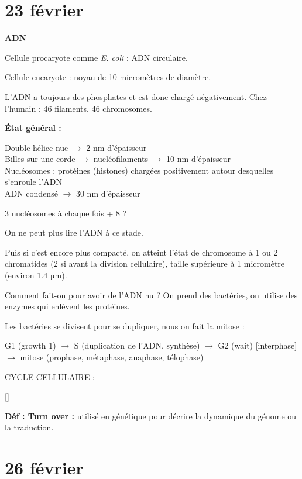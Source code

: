 \documentclass[11pt]{article}
\begin{document}
\section*{23 février}

\textbf{ADN}

Cellule procaryote comme \textit{E. coli} : ADN circulaire.

Cellule eucaryote : noyau de 10 micromètres de diamètre.

L'ADN a toujours des phosphates et est donc chargé négativement. Chez l'humain : 46 filaments, 46 chromosomes.

\vspace{0.3cm}

\textbf{État général :}

Double hélice nue $\rightarrow$ 2 nm d'épaisseur\\
Billes sur une corde $\rightarrow$ nucléofilaments $\rightarrow$ 10 nm d'épaisseur\\
Nucléosomes : protéines (histones) chargées positivement autour desquelles s'enroule l'ADN\\
ADN condensé $\rightarrow$ 30 nm d'épaisseur

3 nucléosomes à chaque fois + 8 ?

On ne peut plus lire l'ADN à ce stade.

Puis si c'est encore plus compacté, on atteint l'état de chromosome à 1 ou 2 chromatides (2 si avant la division cellulaire), taille supérieure à 1 micromètre (environ 1.4 µm).

\vspace{0.3cm}

Comment fait-on pour avoir de l'ADN nu ? On prend des bactéries, on utilise des enzymes qui enlèvent les protéines.

\vspace{0.3cm}

Les bactéries se divisent pour se dupliquer, nous on fait la mitose :

G1 (growth 1) $\rightarrow$ S (duplication de l'ADN, synthèse) $\rightarrow$ G2 (wait) [interphase] $\rightarrow$ mitose (prophase, métaphase, anaphase, télophase)

CYCLE CELLULAIRE :

[]

\textbf{Déf : Turn over :} utilisé en génétique pour décrire la dynamique du génome ou la traduction.

\section*{26 février}
\end{document}
